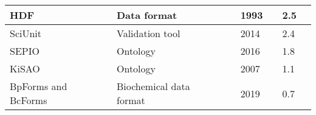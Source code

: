 \begin{longtable}{L{2.2cm}L{4cm}L{1cm}L{0.8cm}R{1.1cm}R{1cm}R{1cm}}
\midrule
\small{HDF} &\small{Data format} &\cite{Brown1993SoftwareManagement} &\small{1993} &\small{} &\small{2.5} &\small{}\\
\midrule
\small{SciUnit} &\small{Validation tool} &\cite{Omar2014CollaborativeValidation} &\small{2014} &\small{} &\small{2.4} &\small{}\\
\midrule
\small{SEPIO} &\small{Ontology} &\cite{Brush2016SEPIO:Evidence} &\small{2016} &\small{} &\small{1.8} &\small{}\\
\midrule
\small{KiSAO} &\small{Ontology} &\cite{Zhukova2011KineticOntology} &\small{2007} &\small{} &\small{1.1} &\small{}\\
\midrule
\small{BpForms and BcForms} &\small{Biochemical data format} &\cite{Lang2019BpForms:Proteins} &\small{2019} &\small{} &\small{0.7} &\small{}\\
\bottomrule\end{longtable}
